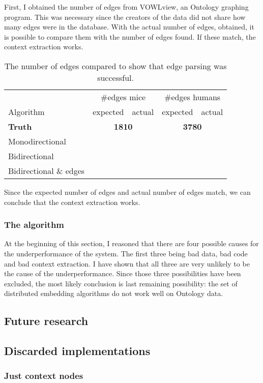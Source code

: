 \documentclass{article}
\begin{document}
  First, I obtained the number of edges from VOWLview\cite{vowlview}, an Ontology graphing program. This was necessary since the creators of the data did not share how many edges were in the database. With the actual number of edges, obtained, it is possible to compare them with the number of edges found. If these match, the context extraction works.
  \begin{table}[H]
  \begin{tabular}{l|ll|ll}
  & \multicolumn{2}{c}{\#edges mice} & \multicolumn{2}{c|}{\#edges humans}\\
  Algorithm & expected & actual & expected & actual\\
  \hline
  \textbf{Truth}\cite{mice_ontology} & \multicolumn{2}{c|}{\textbf{1810}} & \multicolumn{2}{c}{\textbf{3780}} \\
  Monodirectional & & & &\\
  Bidirectional & & & &\\
  Bidirectional \& edges & & & &\\
  \end{tabular}
  \caption{The number of edges compared to show that edge parsing was successful.}
  \label{edgecounts}
  \end{table}
  Since the expected number of edges and actual number of edges match, we can conclude that the context extraction works.
  
  \subsubsection{The algorithm}
  At the beginning of this section, I reasoned that there are four possible causes for the underperformance of the system. The first three being bad data, bad code and bad context extraction. I have shown that all three are very unlikely to be the cause of the underperformance. Since those three possibilities have been excluded, the most likely conclusion is last remaining possibility: the set of distributed embedding algorithms do not work well on Ontology data.
 \subsection{Future research}
 
 
 \subsection{Discarded implementations}

  \subsubsection{Just context nodes}
  
\end{document}
